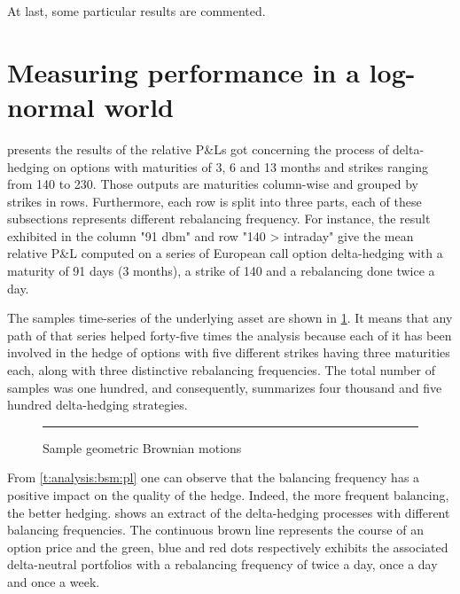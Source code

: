 \documentclass[12pt]{report}
\begin{document}
At last, some particular results are commented.





\section{Measuring performance in a log-normal world}
\label{sec:section name}

 presents the results of the relative P\&Ls got concerning the process of delta-hedging on options with maturities of 3, 6 and 13 months and strikes ranging from 140 to 230.
Those outputs are maturities column-wise and grouped by strikes in rows.
Furthermore, each row is split into three parts, each of these subsections represents different rebalancing frequency.
For instance, the result exhibited in the column "91 dbm" and row "140 > intraday" give the mean relative P\&L computed on a series of European call option delta-hedging with a maturity of 91 days (3 months), a strike of 140 and a rebalancing done twice a day.

The samples time-series of the underlying asset are shown in \cref{p:analysis:gbm:100}. 
It means that any path of that series helped forty-five times the analysis because each of it has been involved in the hedge of options with five different strikes having three maturities each, along with three distinctive rebalancing frequencies.
The total number of samples was one hundred, and consequently,  summarizes four thousand and  five hundred delta-hedging strategies.

\begin{figure}[ht]
  \centering
  \rule{40mm}{20mm}
  \caption{Sample geometric Brownian motions}
  \label{p:analysis:gbm:100}
\end{figure}






From \cref{t:analysis:bsm:pl} one can observe that the balancing frequency has a positive impact on the quality of the hedge.
Indeed, the more frequent balancing, the better hedging.
 shows an extract of the delta-hedging processes with different balancing frequencies.
The continuous brown line represents the course of an option price and the green, blue and red dots respectively exhibits the associated delta-neutral portfolios with a rebalancing frequency of twice a day, once a day and once a week.
\end{document}

